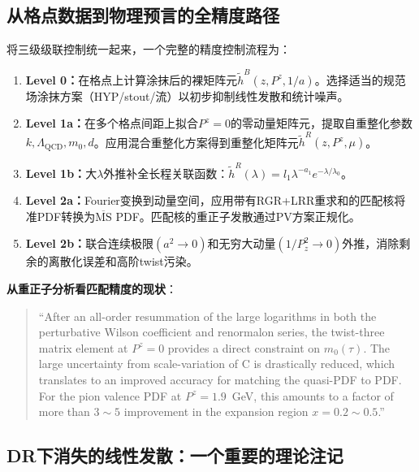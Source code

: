 \documentclass[12pt,a4paper]{ctexart}
\theoremstyle{definition}
\begin{document}
\subsection{从格点数据到物理预言的全精度路径}

将三级级联控制统一起来，一个完整的精度控制流程为\cite{Zhang2023RGR,Chen2025gluon,Huo2021self}：

\begin{enumerate}
    \item \textbf{Level 0：}在格点上计算涂抹后的裸矩阵元$\tilde{h}^B(z, P^z, 1/a)$。选择适当的规范场涂抹方案（HYP/stout/流）以初步抑制线性发散和统计噪声。

    \item \textbf{Level 1a：}在多个格点间距上拟合$P^z=0$的零动量矩阵元，提取自重整化参数$k, \Lambda_{\text{QCD}}, m_0, d$。应用混合重整化方案得到重整化矩阵元$\tilde{h}^R(z, P^z, \mu)$。

    \item \textbf{Level 1b：}大$\lambda$外推补全长程关联函数：$\tilde{h}^R(\lambda) = l_1 \lambda^{-a_1} e^{-\lambda/\lambda_0}$。

    \item \textbf{Level 2a：}Fourier变换到动量空间，应用带有RGR+LRR重求和的匹配核将准PDF转换为$\overline{\text{MS}}$ PDF。匹配核的重正子发散通过PV方案正规化。

    \item \textbf{Level 2b：}联合连续极限$(a^2 \to 0)$和无穷大动量$(1/P_z^2 \to 0)$外推，消除剩余的离散化误差和高阶twist污染。
\end{enumerate}

\textbf{从重正子分析看匹配精度的现状}\cite{Zhang2023RGR}：

\begin{quote}
``After an all-order resummation of the large logarithms in both the perturbative Wilson coefficient and renormalon series, the twist-three matrix element at $P^z = 0$ provides a direct constraint on $m_0(\tau)$. The large uncertainty from scale-variation of C is drastically reduced, which translates to an improved accuracy for matching the quasi-PDF to PDF. For the pion valence PDF at $P^z = 1.9$~GeV, this amounts to a factor of more than $3\sim5$ improvement in the expansion region $x = 0.2\sim0.5$.''
\end{quote}

\subsection{DR下消失的线性发散：一个重要的理论注记}
\end{document}
